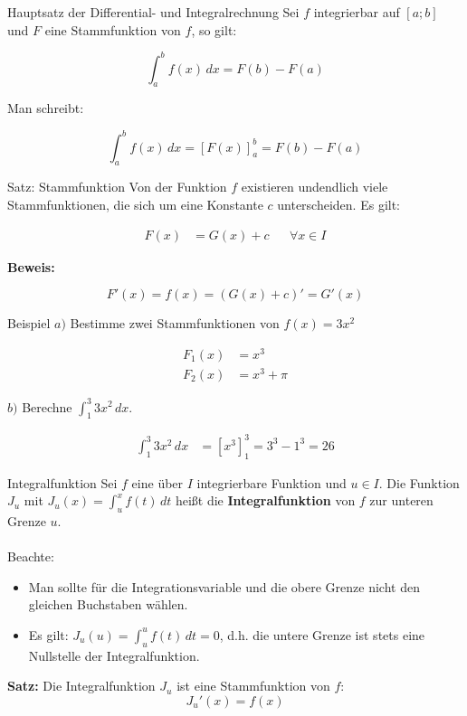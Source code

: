 \documentclass{article}
\begin{document}
\begin{boxx}[Red]{Hauptsatz der Differential- und Integralrechnung}
    Sei $f$ integrierbar auf $[a;b]$ und $F$ eine Stammfunktion von $f$, so gilt:

    \[\int_a^b f(x) \, dx = F(b) - F(a)\]

    Man schreibt:

    \[\int_a^b f(x) \, dx = \left[F(x)\right]_a^b = F(b) - F(a)\]
\end{boxx}

\begin{boxx}[LightGreen]{Satz: Stammfunktion}
    Von der Funktion $f$ existieren undendlich viele Stammfunktionen,
    die sich um eine Konstante $c$ unterscheiden. Es gilt:

    \begin{align*}
        &&&&&& F(x) &= G(x) + c & &\forall x \in I &&&&&&
    \end{align*}

    \textbf{Beweis:}

    \[F'(x)=f(x)=\left(G(x)+c\right)' = G'(x)\]
\end{boxx}

\begin{boxx}[DarkBlue]{Beispiel}
    $a)$\hspace{3mm} Bestimme zwei Stammfunktionen von $\displaystyle f(x) = 3x^2$

    \begin{align*}
        F_1(x) &= x^3 \\
        F_2(x) &= x^3 + \pi
    \end{align*}
    
    $b)$\hspace{3mm} Berechne $\displaystyle \int_1^3 3x^2 \, dx$.

    \begin{align*}
        \int_1^3 3x^2 \, dx &= \left[x^3\right]_1^3 = 3^3 - 1^3 = 26
    \end{align*}
\end{boxx}

\begin{boxx}[Red]{Integralfunktion}
    Sei $f$ eine über $I$ integrierbare Funktion und $u \in I$.
    Die Funktion $J_u$ mit $\displaystyle J_u(x) = \int_u^x f(t) \, dt$ 
    heißt die \textbf{Integralfunktion} von $f$ zur unteren Grenze $u$.
    \\\\
    Beachte:
    \begin{itemize}
        \item Man sollte für die Integrationsvariable und die obere Grenze
        nicht den gleichen Buchstaben wählen.
        \item Es gilt: $\displaystyle J_u(u) = \int_u^u f(t) \, dt = 0$,
        d.h. die untere Grenze ist stets eine Nullstelle der Integralfunktion.
    \end{itemize}
    
    \textbf{Satz:}
    Die Integralfunktion $J_u$ ist eine Stammfunktion von $f$:
    \[J_u'(x)=f(x)\]
\end{boxx}
\end{document}
